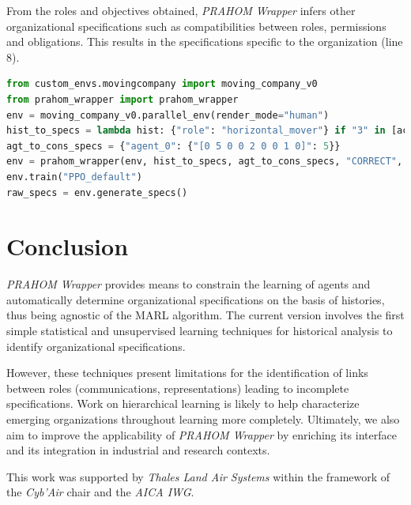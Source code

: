 \documentclass{ecai}
\begin{document}
From the roles and objectives obtained, \emph{PRAHOM Wrapper} infers other organizational specifications such as compatibilities between roles, permissions and obligations. This results in the specifications specific to the organization (line 8).

\begin{lstlisting}[language=Python, caption={Synthetic use of \emph{PRAHOM Wrapper} for \emph{Moving Company}}, label={lst:wrapper_mc}]
from custom_envs.movingcompany import moving_company_v0
from prahom_wrapper import prahom_wrapper
env = moving_company_v0.parallel_env(render_mode="human")
hist_to_specs = lambda hist: {"role": "horizontal_mover"} if "3" in [act for obs, act in hist.items()] else None
agt_to_cons_specs = {"agent_0": {"[0 5 0 0 2 0 0 1 0]": 5}}
env = prahom_wrapper(env, hist_to_specs, agt_to_cons_specs, "CORRECT", ["sequence_clustering"], ["role", "goals"], ["dendogram", "PCA"])
env.train("PPO_default")
raw_specs = env.generate_specs()
\end{lstlisting}

\section{Conclusion}

\emph{PRAHOM Wrapper} provides means to constrain the learning of agents and automatically determine organizational specifications on the basis of histories, thus being agnostic of the MARL algorithm.
The current version involves the first simple statistical and unsupervised learning techniques for historical analysis to identify organizational specifications.

However, these techniques present limitations for the identification of links between roles (communications, representations) leading to incomplete specifications.
Work on hierarchical learning is likely to help characterize emerging organizations throughout learning more completely.
Ultimately, we also aim to improve the applicability of \emph{PRAHOM Wrapper} by enriching its interface and its integration in industrial and research contexts.





\begin{ack}
    This work was supported by \emph{Thales Land Air Systems} within the framework of the \emph{Cyb'Air} chair and the \emph{AICA IWG}.
\end{ack}




\end{document}
